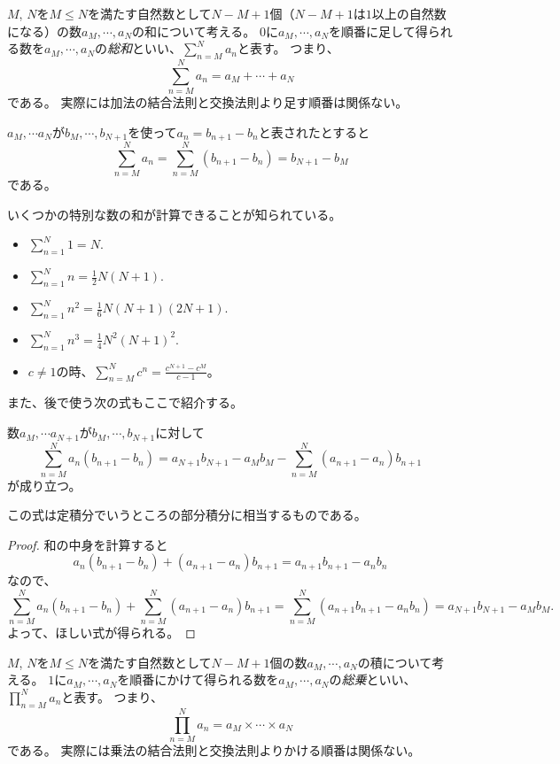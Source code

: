 $M$, $N$を$M \le N$を満たす自然数として$N-M+1$個（$N-M+1$は$1$以上の自然数になる）の数$a_M, \cdots, a_N$の和について考える。
$0$に$a_M, \cdots, a_N$を順番に足して得られる数を$a_M, \cdots, a_N$の\emph{総和}といい、$\sum_{n = M}^N a_n$と表す。
つまり、
$$
\sum_{n = M}^N a_n = a_M+\cdots+a_N
$$
である。
実際には加法の結合法則と交換法則より足す順番は関係ない。

\begin{proposition}
$a_M, \cdots a_N$が$b_M, \cdots, b_{N+1}$を使って$a_n = b_{n+1}-b_n$と表されたとすると
$$
\sum_{n = M}^N a_n = \sum_{n = M}^N(b_{n+1}-b_n) = b_{N+1}-b_M
$$
である。
\end{proposition}

いくつかの特別な数の和が計算できることが知られている。

\begin{proposition}[和の公式]
\begin{itemize}
\item
$\sum_{n = 1}^N 1 = N$.
\item
$\sum_{n = 1}^N n = \frac{1}{2}N(N+1)$.
\item
$\sum_{n = 1}^N n^2 = \frac{1}{6}N(N+1)(2 N+1)$.
\item
$\sum_{n = 1}^N n^3 = \frac{1}{4}N^2(N+1)^2$.
\item
$c \ne 1$の時、$\sum_{n = M}^N c^n = \frac{c^{N+1}-c^M}{c-1}$。
\end{itemize}
\end{proposition}

また、後で使う次の式もここで紹介する。

\begin{proposition}[部分和分]
\label{t_sum_part}
数$a_M, \cdots a_{N+1}$が$b_M, \cdots, b_{N+1}$に対して
$$
\sum_{n = M}^N a_n(b_{n+1}-b_n) = a_{N+1}b_{N+1}-a_M b_M-\sum_{n = M}^N (a_{n+1}-a_n)b_{n+1}
$$
が成り立つ。
\end{proposition}

この式は定積分でいうところの部分積分に相当するものである。

\begin{proof}
和の中身を計算すると
$$
a_n(b_{n+1}-b_n)+(a_{n+1}-a_n)b_{n+1} = a_{n+1}b_{n+1}-a_n b_n
$$
なので、
$$
\sum_{n = M}^N a_n(b_{n+1}-b_n)+\sum_{n = M}^N (a_{n+1}-a_n)b_{n+1} = \sum_{n = M}^N (a_{n+1}b_{n+1}-a_n b_n) = a_{N+1}b_{N+1}-a_M b_M.
$$
よって、ほしい式が得られる。
\end{proof}

$M$, $N$を$M \le N$を満たす自然数として$N-M+1$個の数$a_M, \cdots, a_N$の積について考える。
$1$に$a_M, \cdots, a_N$を順番にかけて得られる数を$a_M, \cdots, a_N$の\emph{総乗}といい、$\prod_{n = M}^N a_n$と表す。
つまり、
$$
\prod_{n = M}^N a_n = a_M\times\cdots\times a_N
$$
である。
実際には乗法の結合法則と交換法則よりかける順番は関係ない。

